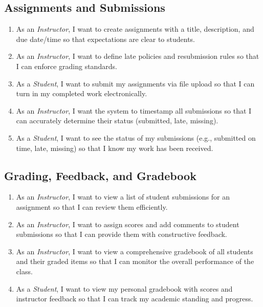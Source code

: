 \documentclass[12pt, a4paper]{article}
\begin{document}
\subsection{Assignments and Submissions}
\begin{enumerate}[label=\textbf{US\,\arabic*}, start=14]
  \item As an \emph{Instructor}, I want to create assignments with a title,
        description, and due date/time so that expectations are clear to
        students.
  \item As an \emph{Instructor}, I want to define late policies and
        resubmission rules so that I can enforce grading standards.
  \item As a \emph{Student}, I want to submit my assignments via file upload
        so that I can turn in my completed work electronically.
  \item As an \emph{Instructor}, I want the system to timestamp all
        submissions so that I can accurately determine their status (submitted,
        late, missing).
  \item As a \emph{Student}, I want to see the status of my submissions (e.g.,
        submitted on time, late, missing) so that I know my work has been
        received.
\end{enumerate}

\subsection{Grading, Feedback, and Gradebook}
\begin{enumerate}[label=\textbf{US\,\arabic*}, start=19]
  \item As an \emph{Instructor}, I want to view a list of student submissions
        for an assignment so that I can review them efficiently.
  \item As an \emph{Instructor}, I want to assign scores and add comments to
        student submissions so that I can provide them with constructive
        feedback.
  \item As an \emph{Instructor}, I want to view a comprehensive gradebook of
        all students and their graded items so that I can monitor the overall
        performance of the class.
  \item As a \emph{Student}, I want to view my personal gradebook with scores
        and instructor feedback so that I can track my academic standing and
        progress.
\end{enumerate}
\end{document}
